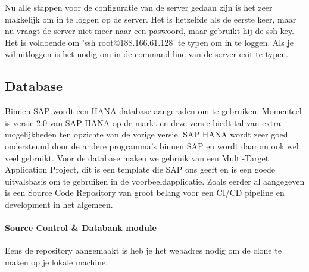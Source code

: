             Nu alle stappen voor de configuratie van de server gedaan zijn is het zeer makkelijk om in te loggen op de server.
            Het is hetzelfde als de eerste keer, maar nu vraagt de server niet meer naar een paswoord, maar gebruikt hij de ssh-key. Het is voldoende om 
            'ssh root@188.166.61.128' te typen om in te loggen.
            Als je wil uitloggen is het nodig om in de command line van de server exit te typen.
    
        \subsection{Database}
        \label{subsec:database}
        Binnen SAP wordt een HANA database aangeraden om te gebruiken. Momenteel is versie 2.0 van SAP HANA op de markt en deze versie biedt tal van extra mogelijkheden ten opzichte van de vorige versie. SAP HANA wordt zeer goed ondersteund door de andere programma's binnen SAP en wordt daarom ook wel veel gebruikt.
        Voor de database maken we gebruik van een Multi-Target Application Project, dit is een template die SAP ons geeft en is een goede uitvalsbasis om te gebruiken in de voorbeeldapplicatie.
        Zoals eerder al aangegeven is een Source Code Repository van groot belang voor een CI/CD pipeline en development in het algemeen.
        
            \paragraph{Source Control \& Databank module}
            Eens de repository aangemaakt is heb je het webadres nodig om de clone te maken op je lokale machine.
    
